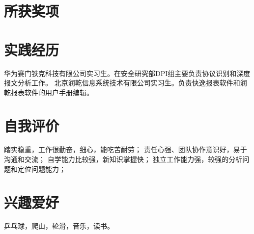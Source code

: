 \documentclass[a4paper]{moderncv}
\begin{document}
\begin{CJK*}{UTF8}{gbsn}
\section{所获奖项}
\section{实践经历}
{华为赛门铁克科技有限公司实习生。在安全研究部DPI组主要负责协议识别和深度报文分析工作。}
{ 北京润乾信息系统技术有限公司实习生。负责快逸报表软件和润乾报表软件的用户手册编辑。 }

\section{自我评价}
\cvitem{}{}
{
踏实稳重，工作很勤奋，细心，能吃苦耐劳；
责任心强、团队协作意识好，易于沟通和交流；
自学能力比较强，新知识掌握快；
独立工作能力强，较强的分析问题和定位问题能力；
}

\section{兴趣爱好}
\cvitem{}
{
乒乓球，爬山，轮滑，音乐，读书。
}
\closesection
\end{CJK*}
\end{document}
